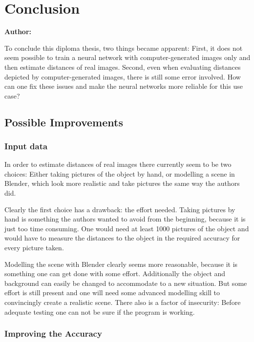 \chapter{Conclusion}

\textbf{Author: } 

To conclude this diploma thesis, two things became apparent: First, it does not seem possible to train a neural network with computer-generated images only and then estimate distances of real images. Second, even when evaluating distances depicted by computer-generated images, there is still some error involved. How can one fix these issues and make the neural networks more reliable for this use case?

\section{Possible Improvements}

\subsection{Input data}

In order to estimate distances of real images there currently seem to be two choices: Either taking pictures of the object by hand, or modelling a scene in Blender, which look more realistic and take pictures the same way the authors did.

Clearly the first choice has a drawback: the effort needed. Taking pictures by hand is something the authors wanted to avoid from the beginning, because it is just too time consuming. One would need at least 1000 pictures of the object and would have to measure the distances to the object in the required accuracy for every picture taken.

Modelling the scene with Blender clearly seems more reasonable, because it is something one can get done with some effort. Additionally the object and background can easily be changed to accommodate to a new situation. But some effort is still present and one will need some advanced modelling skill to convincingly create a realistic scene. There also is a factor of insecurity: Before adequate testing one can not be sure if the program is working.

\subsection{Improving the Accuracy}

